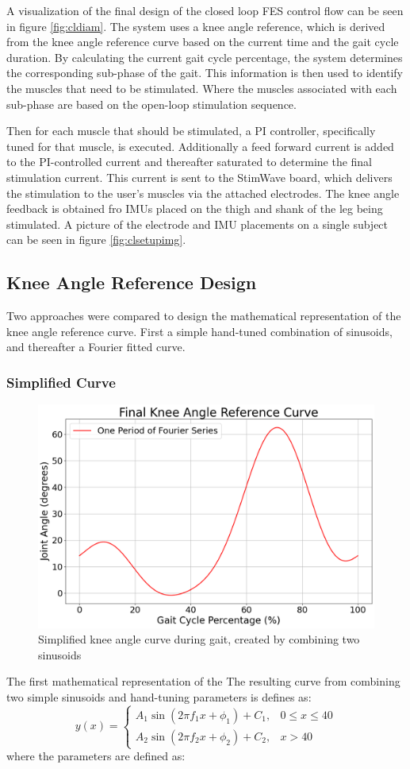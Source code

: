 A visualization of the final design of the closed loop FES control flow can be seen in figure \ref{fig:cldiam}. The system uses a knee angle reference, which is derived from the knee angle reference curve based on the current time and the gait cycle duration. By calculating the current gait cycle percentage, the system determines the corresponding sub-phase of the gait. This information is then used to identify the muscles that need to be stimulated. Where the muscles associated with each sub-phase are based on the open-loop stimulation sequence. 

Then for each muscle that should be stimulated, a PI controller, specifically tuned for that muscle, is executed. Additionally a feed forward current is added to the PI-controlled current and thereafter saturated to determine the final stimulation current. This current is sent to the StimWave board, which delivers the stimulation to the user's muscles via the attached electrodes. The knee angle feedback is obtained fro IMUs placed on the thigh and shank of the leg being stimulated. A picture of the electrode and IMU placements on a single subject can be seen in figure \ref{fig:clsetupimg}.

\subsection{Knee Angle Reference Design}
Two approaches were compared to design the mathematical representation of the knee angle reference curve. First a simple hand-tuned combination of sinusoids, and thereafter a Fourier fitted curve.
\subsubsection{Simplified Curve}
\begin{figure} [H]
    \centering
    \includegraphics[width=0.75\linewidth]{images/bigfinalref.png}
    \caption{Simplified knee angle curve during gait, created by combining two sinusoids}
    \label{fig:simplecurve}
\end{figure}
The first mathematical representation of the
The resulting curve from combining two simple sinusoids and hand-tuning parameters is defines as:
\[
y(x) =
\begin{cases}
A_1 \sin\left(2 \pi f_1 x + \phi_1\right) + C_1, & 0 \leq x \leq 40 \\
A_2 \sin\left(2 \pi f_2 x + \phi_2\right) + C_2, & x > 40
\end{cases}
\]
where the parameters are defined as:

